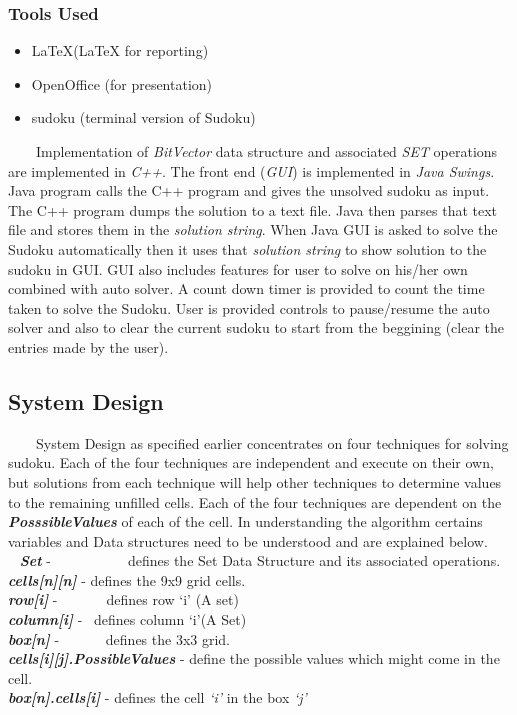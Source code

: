 \documentclass[12pt,a4paper]{article}
\begin{document}
\subsubsection{Tools Used}
\begin{itemize}
\item{ \LaTeX (LaTeX for reporting)}
\item{ OpenOffice (for presentation)}
\item{ sudoku (terminal version of Sudoku) }
\end{itemize}
\ \ \ \ Implementation of \textit{BitVector} data structure and associated \textit{SET} operations are implemented in \textit{C++}. The front end (\textit{GUI}) is implemented in \textit{Java Swings}. Java program calls the C++ program and gives the unsolved sudoku as input. The C++ program dumps the solution to a text file. Java then parses that text file and stores them in the \textit{solution string}. When Java GUI is asked to solve the Sudoku automatically then it uses that \textit{solution string} to show solution to the sudoku in GUI. GUI also includes features for user to solve on his/her own combined with auto solver. A count down timer is provided to count the time taken to solve the Sudoku. User is provided controls to pause/resume the auto solver and also to clear the current sudoku to start from the beggining (clear the entries made by the user).

\subsection{System Design}
\ \ \ \ System Design as specified earlier concentrates on four techniques for solving sudoku. Each of the four techniques are independent and execute on their own, but solutions from each technique will help other techniques to determine values to the remaining unfilled cells. Each of the four techniques are dependent on the \textit{\textbf{PosssibleValues}} of each of the cell. In understanding the algorithm certains variables and Data structures need to be understood and are explained below.\\
\ \newline
\textit{\textbf{Set}} -\ \ \ \ \ \ \ \ \ \ \  defines the Set Data Structure and its associated operations.\\
\textit{\textbf{cells[n][n]}} - defines the 9x9 grid cells.\\
\textit{\textbf{row[i]}} -\ \ \ \ \ \ \ defines row `i' (A set)\\
\textit{\textbf{column[i]}} - \ defines column `i'(A Set)\\
\textit{\textbf{box[n]}} - \ \ \ \ \ \ defines the 3x3 grid.\\
\textit{\textbf{cells[i][j].PossibleValues}} - define the possible values which might come in the cell. \\
\textit{\textbf{box[n].cells[i]}} - defines the cell \textit{`i'} in the box \textit{`j'}\\
\end{document}
